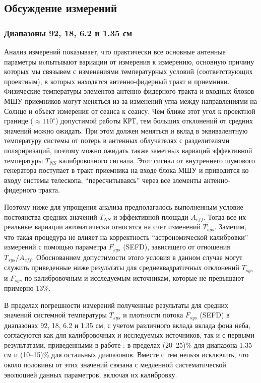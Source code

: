 \subsection{Обсуждение измерений}
\subsubsection{Диапазоны 92, 18, 6.2 и 1.35 см}

Анализ измерений показывает, что практически все основные антенные параметры иcпытывают вариации от
измерения к измерению, основную причину которых мы связывем с изменениями температурных условий
(соответствующих проектным), в которых находятся антенно-фидерный тракт и приемники. Физические
температуры элементов антенно-фидерного тракта и входных блоков МШУ приемников могут меняться из-за
изменений угла между направлениями на Солнце и объект измерения от сеанса к сеансу. Чем ближе этот
угол к проектной границе ($\approx 110^\circ$) допустимой работы КРТ, тем больших отклонений от
средних значений можно ожидать. При этом должен меняться и вклад в эквивалентную температуру системы
от потерь в антенных облучателях с разделителями поляриризаций, поэтому можно ожидать также заметных
вариаций эффективной температуры $T_{NS}$ калибровочного сигнала. Этот сигнал от внутреннего
шумового генератора поступает в тракт приемника на входе блока МШУ и приводится ко входу системы
телескопа, ``пересчитываясь'' через все элементы антенно-фидерного тракта.

Поэтому ниже для упрощения анализа предполагалось выполненным условие постоянства средних значений
$T_{NS}$ и  эффективной площади $A_{eff}$. Тогда все их реальные вариации автоматически относятся на
счет изменений $T_{sys}$. Заметим, что такая процедура не влияет на корректность ``астрономической
калибровки'' измерений с помощью параметра $F_{sys}$ (SEFD), зависящего от отношения $T_{sys} /
A_{eff}$. Обоснованием допустимости этого условия в данном случае могут служить приведенные ниже
результаты для среднеквадратичных отклонений $T_{sys}$ и $F_{sys}$ по калибровочным и исследуемым
источникам, которые не превышают примерно 13\%.

В пределах погрешности измерений полученные результаты для средних значений системной температуры
$T_{sys}$ и плотности потока $F_{sys}$ (SEFD) в диапазонах 92, 18, 6.2 и 1.35 см, с учетом
различного вклада вклада фона неба, согласуются как для калибровочных и исследуемых источников, так
и с первыми результатами, приведенными в работе \cite{Kardashev_2013_rus}: в пределах (20--25)\%
для диапазона 1.35 см и (10--15)\% для остальных диапазонов. Вместе с тем нельзя исключить, что
около половины от этих значений связана с медленной систематической эволюцией данных параметров,
включая их калибровку.

